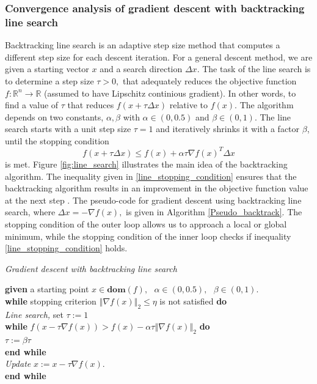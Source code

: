\subsubsection{Convergence analysis of gradient descent with backtracking line search}
Backtracking line search is an adaptive step size method that computes a different step size for each descent iteration. For a general descent method, we are given a starting vector $x$ and a search direction $\Delta x.$ The task of the line search is to determine a step size $\tau>0,$ that adequately reduces the objective function $f:\mathbb{R}^{n}\longrightarrow\mathbb{R}$ (assumed to have Lipschitz continious gradient). In other words, to find a value of $\tau$ that reduces $f(x+\tau\Delta x)$ relative to $f(x).$ The algorithm depends on two constants, $\alpha,\beta$ with $\alpha\in(0,0.5)$ and $\beta\in(0,1).$ The line search starts with a unit step size $\tau=1$ and iteratively shrinks it with a factor $\beta$, until the stopping condition  
\begin{equation*}\tag{4.2.2.1}\label{line_stopping_condition}
f(x+\tau\Delta x)\leq f(x) + \alpha\tau\nabla f(x)^{T}\Delta x
\end{equation*}
is met.
Figure \ref{fig:line_search} illustrates the main idea of the backtracking algorithm. The inequality given in \eqref{line_stopping_condition} ensures that the backtracking algorithm results in an improvement in the objective function value at the next step \cite{boyd2004convex}. The pseudo-code for gradient descent using backtracking line search, where $\Delta x = -\nabla f(x),$ is given in Algorithm \ref{Pseudo_backtrack}. The stopping condition of the outer loop allows us to approach a local or global minimum, while the stopping condition of the inner loop checks if inequality \eqref{line_stopping_condition} holds.
\begin{algorithm}
\caption{\textit{Gradient descent with backtracking line search}}\label{Pseudo_backtrack}
\begin{algorithmic}
\vspace{0.05cm}
\State \textbf{given} a starting point $x\in\textbf{dom} (f),\text{ } \alpha\in(0,0.5),\text{ }\beta\in(0,1).$\\
\textbf{while} stopping criterion $\left\Vert\nabla f(x)\right\Vert_{2}\leq \eta$ is not satisfied \textbf{do}\\
\hspace{0.3cm} \textit{Line search,} set $\tau:=1$\\
\hspace{1.1cm} \textbf{while} $f(x-\tau\nabla f(x))> f(x) - \alpha\tau\left\Vert\nabla f(x)\right\Vert_{2}$ \textbf{do}\\
\quad \hspace{1.2cm} $\tau:=\beta\tau$\\
\hspace{1.1cm} \textbf{end while}\\
\hspace{0.3cm} \textit{Update} $x:=x-\tau\nabla f(x).$\\
\textbf{end while}
\vspace{0.05cm}
\end{algorithmic}
\end{algorithm}\\
